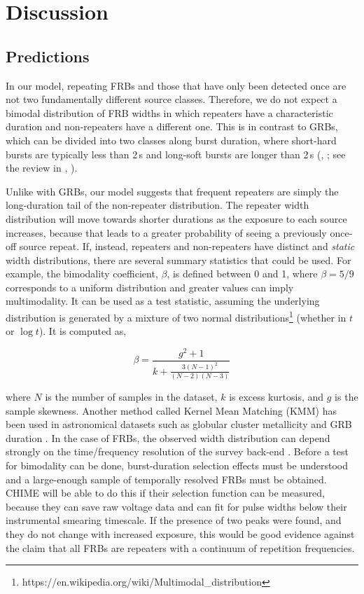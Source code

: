\documentclass[fleqn,usenatbib]{mnras}
\begin{document}
\section{Discussion}

\subsection{Predictions}

In our model, repeating FRBs and those that have only been detected 
once are not two fundamentally different source classes. Therefore, 
we do not expect a bimodal distribution of FRB widths in which 
repeaters have a characteristic duration and non-repeaters have a different 
one. This 
is in contrast to GRBs, which can be divided into two classes along 
burst duration, where short-hard bursts are typically less than 
2\,s and long-soft bursts are longer than 2\,s  
(\citeauthor{Kouveliotou-1993}, \citeyear{Kouveliotou-1993}; see the review in \citeauthor{berger-2014}, \citeyear{berger-2014}). 

Unlike with 
GRBs, our model suggests that frequent 
repeaters are simply the 
long-duration tail of the non-repeater distribution. The repeater width distribution will move towards shorter durations 
as the exposure to each source increases, because that leads to a 
greater probability of seeing a previously once-off source repeat. 
If, instead, repeaters and non-repeaters 
have distinct and \textit{static} width distributions, 
there are several summary statistics that could be used. 
For example, the bimodality coefficient, $\beta$, is defined between 
0 and 1, where $\beta=5/9$ corresponds to a uniform distribution and
greater values can imply multimodality. It 
can be used as a test statistic, assuming the 
underlying distribution is generated by a mixture of two normal
distributions\footnote{https://en.wikipedia.org/wiki/Multimodal\_distribution} (whether in $t$ or $\log t$). 
It is computed as,

\begin{equation}
\beta = \frac{g^2 + 1}{k + \frac{3(N-1)^2}{(N-2)(N-3)}}
\end{equation}

\noindent where $N$ is the number of samples in the dataset, 
$k$ is excess kurtosis, and $g$ is the sample skewness. Another method 
called Kernel Mean Matching (KMM) has been used in astronomical 
datasets such as globular cluster metallicity and 
GRB duration \citep{ashman-1994}. In the case of FRBs, the 
observed width distribution can depend strongly 
on the time/frequency resolution of the 
survey back-end \citep{connor-2019}. Before a test for 
bimodality can be done, burst-duration selection effects 
must be understood and a large-enough sample of 
temporally resolved FRBs must be obtained. 
CHIME will be able to 
do this if their selection function can be measured, 
because they can save raw voltage data and can fit for pulse widths 
below their instrumental smearing timescale. If the 
presence of two peaks were found, and they do not change 
with increased exposure, this would be good 
evidence against the claim that all FRBs are repeaters 
with a continuum of repetition frequencies.
\end{document}
